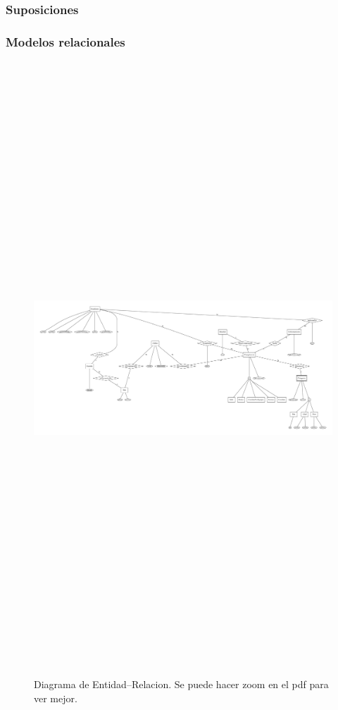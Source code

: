 
\subsubsection{Suposiciones}

\subsubsection{Modelos relacionales}

\newpage

\begin{figure}[H]
 \centering
 \includegraphics[angle=90,height=23cm]{../mer/mer-dot.pdf}
 \caption{Diagrama de Entidad--Relacion. Se puede hacer zoom en el pdf para ver mejor.}
\end{figure}

